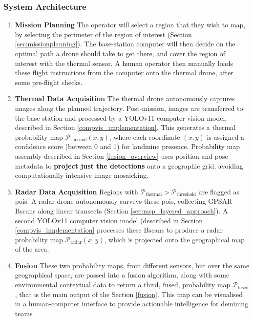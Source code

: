 

    \subsubsection{System Architecture} \label{compvis_methods}
    
        \begin{enumerate}
        
            \item \textbf{Mission Planning} The operator will select a region that they wish to map, by selecting the perimeter of the region of interest (Section \ref{sec:missionplanning}). The base-station computer will then decide on the optimal path a drone should take to get there, and cover the region of interest with the thermal sensor. A human operator then manually loads these flight instructions from the computer onto the thermal drone, after some pre-flight checks.
            
            \item \textbf{Thermal Data Acquisition} The thermal drone autonomously captures images along the planned trajectory. Post-mission, images are transferred to the base station and processed by a YOLOv11 computer vision model, described in Section \ref{compvis_implementation}. This generates a thermal probability map \(\mathcal{P}_{\text{thermal}}(x,y)\), where each coordinate \((x,y)\) is assigned a confidence score (between 0 and 1) for landmine presence. Probability map assembly described in Section \ref{fusion_overview} uses position and pose metadata to \textbf{project just the detections} onto a geographic grid, avoiding computationally intensive image mosaicking.
            
            \item \textbf{Radar Data Acquisition} Regions with \(\mathcal{P}_{\text{thermal}} > \mathcal{P}_{\text{threshold}}\) are flagged as \gls{poi}s. A radar drone autonomously surveys these \gls{poi}s, collecting GPSAR Bscans along linear transects (Section \ref{sec:msp_layered_approach}). A second YOLOv11 computer vision model (described in Section \ref{compvis_implementation} processes these Bscans to produce a radar probability map \(\mathcal{P}_{\text{radar}}(x,y)\), which is projected onto the geographical map of the area.
            
            \item \textbf{Fusion} These two probability maps, from different sensors, but over the same geographical space, are passed into a fusion algorithm, along with some environmental contextual data to return a third, fused, probability map $\mathcal{P}_{\text{fused}}$, that is the main output of the Section \ref{fusion}. This map can be visualised in a human-computer interface to provide actionable intelligence for demining teams
            
        \end{enumerate}



